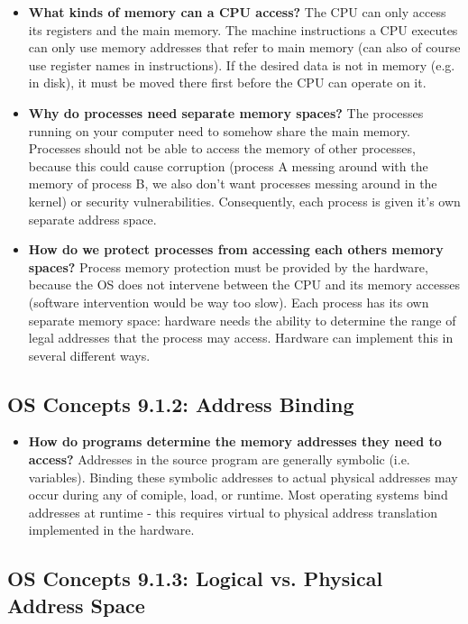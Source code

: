 \documentclass[12pt]{article}
\begin{document}
\begin{itemize}
    \item \textbf{What kinds of memory can a CPU access?} The CPU can only access its registers and the main memory. The machine instructions a CPU executes can only use memory addresses that refer to main memory (can also of course use register names in instructions). If the desired data is not in memory (e.g. in disk), it must be moved there first before the CPU can operate on it.
    \item \textbf{Why do processes need separate memory spaces?} The processes running on your computer need to somehow share the main memory. Processes should not be able to access the memory of other processes, because this could cause corruption (process A messing around with the memory of process B, we also don't want processes messing around in the kernel) or security vulnerabilities. Consequently, each process is given it's own separate address space.
    \item \textbf{How do we protect processes from accessing each others memory spaces?} Process memory protection must be provided by the hardware, because the OS does not intervene between the CPU and its memory accesses (software intervention would be way too slow). Each process has its own separate memory space: hardware needs the ability to determine the range of legal addresses that the process may access. Hardware can implement this in several different ways.
\end{itemize}

\subsection*{OS Concepts 9.1.2: Address Binding}

\begin{itemize}
    \item \textbf{How do programs determine the memory addresses they need to access?} Addresses in the source program are generally symbolic (i.e. variables). Binding these symbolic addresses to actual physical addresses may occur during any of comiple, load, or runtime. Most operating systems bind addresses at runtime - this requires virtual to physical address translation implemented in the hardware.
\end{itemize}

\subsection*{OS Concepts 9.1.3: Logical vs. Physical Address Space}
\end{document}
